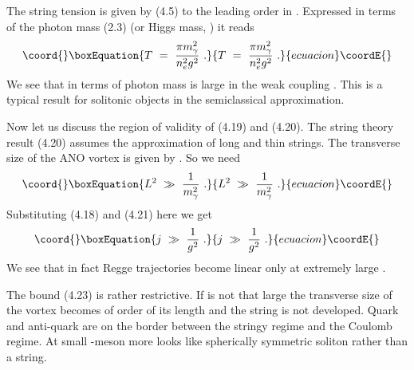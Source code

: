 \documentclass[a4paper,12pt]{article}
\begin{document}
 The
string tension \coordHE{} is given by (4.5) to the leading order in
\myHighlight{$\mu $}\coordHE{}. Expressed in terms of the photon mass (2.3) (or
Higgs mass, \coordHE{}) it reads
\begin{equation}\coord{}\boxEquation{
T\ =\ \frac{\pi m^2_\gamma}{n^2_eg^2}\ .
}{
T\ =\ \frac{\pi m^2_\gamma}{n^2_eg^2}\ .
}{ecuacion}\coordE{}\end{equation}
We see that in terms of photon mass \coordHE{} is large in the weak coupling
 \coordHE{}. This is a typical result for solitonic objects
in the semiclassical approximation.

Now let us discuss the region of validity of (4.19) and (4.20).
The string theory result (4.20) assumes the approximation of long
and thin strings. The transverse size of the ANO vortex is given
by \coordHE{}. So we need
\begin{equation}\coord{}\boxEquation{
L^2\ \gg\ \frac1{m^2_\gamma}\ .
}{
L^2\ \gg\ \frac1{m^2_\gamma}\ .
}{ecuacion}\coordE{}\end{equation}
Substituting (4.18) and (4.21) here we get
\begin{equation}\coord{}\boxEquation{
j\ \gg\ \frac1{g^2}\ .
}{
j\ \gg\ \frac1{g^2}\ .
}{ecuacion}\coordE{}\end{equation}
We see that in fact Regge trajectories become linear only at
extremely large \coordHE{}.

The bound (4.23) is rather restrictive. If \coordHE{} is not that large
the transverse size of the vortex becomes of  order of
its length and the string is not developed. Quark and anti-quark
are on the border between the stringy regime and the Coulomb
regime.
 At small \coordHE{}  \coordHE{}-meson more looks like spherically
symmetric soliton  rather than a
string.
\end{document}
